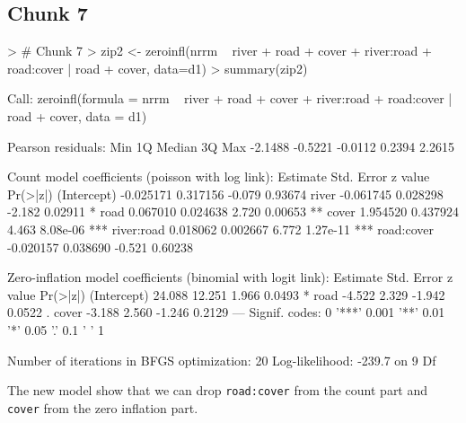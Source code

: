 \documentclass{article}
\begin{document}
\subsection{Chunk 7}
\begin{Schunk}
\begin{Sinput}
> # Chunk 7
> zip2 <- zeroinfl(nrrm ~ river + road + cover + river:road + road:cover | road + cover, data=d1)
> summary(zip2)
\end{Sinput}
\begin{Soutput}
Call:
zeroinfl(formula = nrrm ~ river + road + cover + river:road + road:cover | 
    road + cover, data = d1)

Pearson residuals:
    Min      1Q  Median      3Q     Max 
-2.1488 -0.5221 -0.0112  0.2394  2.2615 

Count model coefficients (poisson with log link):
             Estimate Std. Error z value Pr(>|z|)    
(Intercept) -0.025171   0.317156  -0.079  0.93674    
river       -0.061745   0.028298  -2.182  0.02911 *  
road         0.067010   0.024638   2.720  0.00653 ** 
cover        1.954520   0.437924   4.463 8.08e-06 ***
river:road   0.018062   0.002667   6.772 1.27e-11 ***
road:cover  -0.020157   0.038690  -0.521  0.60238    

Zero-inflation model coefficients (binomial with logit link):
            Estimate Std. Error z value Pr(>|z|)  
(Intercept)   24.088     12.251   1.966   0.0493 *
road          -4.522      2.329  -1.942   0.0522 .
cover         -3.188      2.560  -1.246   0.2129  
---
Signif. codes:  0 '***' 0.001 '**' 0.01 '*' 0.05 '.' 0.1 ' ' 1 

Number of iterations in BFGS optimization: 20 
Log-likelihood: -239.7 on 9 Df
\end{Soutput}
\end{Schunk}

The new model show that we can drop \verb!road:cover! from the count part and \verb!cover! from the zero inflation part.
\end{document}
